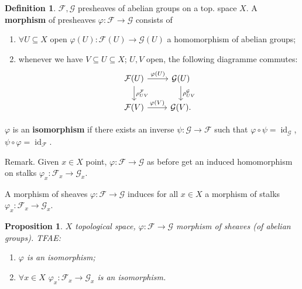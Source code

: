 \documentclass[12pt]{article}
\DeclareMathOperator{\id}{id}
\newtheorem*{proposition}{Proposition}
\theoremstyle{definition}
\newtheorem*{definition}{Definition}
\begin{document}
\begin{definition}
$\mathcal{F},\mathcal{G}$ presheaves of abelian groups on a top. space $X$. A \textbf{morphism} of presheaves $\varphi:\mathcal{F}\rightarrow\mathcal{G}$ consists of
\begin{enumerate}[label=\arabic*)]
\item $\forall U\subseteq X$ open $\varphi(U):\mathcal{F}(U)\rightarrow\mathcal{G}(U)$ a homomorphism of abelian groups;
\item whenever we have $V\subseteq U\subseteq X$; $U,V$ open, the following diagramme commutes:
\[
\begin{tikzcd}
\mathcal{F}(U)\arrow[r,"\varphi(U)"]\arrow[d,"\rho_{UV}^{\mathcal{F}}"]&\mathcal{G}(U)\arrow[d,"\rho_{UV}^{\mathcal{G}}"]\\
\mathcal{F}(V)\arrow[r,"\varphi(V)"]&\mathcal{G}(V).
\end{tikzcd}
\]
\end{enumerate}

$\varphi$ is an \textbf{isomorphism} if there exists an inverse $\psi:\mathcal{G}\rightarrow\mathcal{F}$ such that $\varphi\circ\psi=\id_{\mathcal{G}}$, $\psi\circ\varphi=\id_{\mathcal{F}}$.
\end{definition}

Remark. Given $x\in X$ point, $\varphi:\mathcal{F}\rightarrow\mathcal{G}$ as before get an induced homomorphism on stalks $\varphi_x:\mathcal{F}_x\rightarrow\mathcal{G}_x$.

A morphism of sheaves $\varphi:\mathcal{F}\rightarrow\mathcal{G}$ induces for all $x\in X$ a morphism of stalks $\varphi_x:\mathcal{F}_x\rightarrow\mathcal{G}_x$.

\begin{proposition}
$X$ topological space, $\varphi:\mathcal{F}\rightarrow\mathcal{G}$ morphism of sheaves (of abelian groups). TFAE:
\begin{enumerate}[label=\arabic*)]
\item $\varphi$ is an isomorphism;
\item $\forall x\in X$ $\varphi_x:\mathcal{F}_x\rightarrow\mathcal{G}_x$ is an isomorphism.
\end{enumerate}
\end{proposition}
\end{document}
